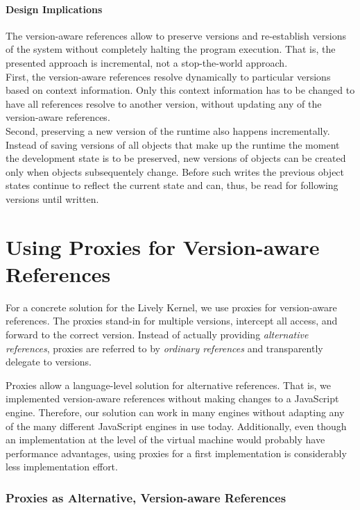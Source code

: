 \paragraph{Design Implications}
The version-aware references allow to preserve versions and re-establish versions of the system without completely halting the program execution.
That is, the presented approach is incremental, not a stop-the-world approach.\\
First, the version-aware references resolve dynamically to particular versions based on context information.
Only this context information has to be changed to have all references resolve to another version, without updating any of the version-aware references.\\
Second, preserving a new version of the runtime also happens incrementally.
Instead of saving versions of all objects that make up the runtime the moment the development state is to be preserved, new versions of objects can be created only when objects subsequentely change.
Before such writes the previous object states continue to reflect the current state and can, thus, be read for following versions until written.




\section{Using Proxies for Version-aware References} \label{sec:APPROACH:2}

For a concrete solution for the Lively Kernel, we use proxies for version-aware references.
The proxies stand-in for multiple versions, intercept all access, and forward to the correct version.
Instead of actually providing \emph{alternative references}, proxies are referred to by \emph{ordinary references} and transparently delegate to versions. 

Proxies allow a language-level solution for alternative references.
That is, we implemented version-aware references without making changes to a JavaScript engine.
Therefore, our solution can work in many engines without adapting any of the many different JavaScript engines in use today.
Additionally, even though an implementation at the level of the virtual machine would probably have performance advantages, using proxies for a first implementation is considerably less implementation effort.


\subsubsection{Proxies as Alternative, Version-aware References}

